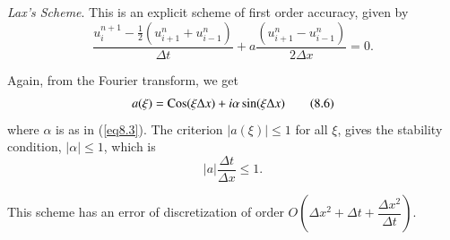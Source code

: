 \begin{exam}\label{chap8:exam8.2}
{\em Lax's Scheme}. This is an explicit scheme of first order accuracy, given by 
\begin{equation*}
\frac{u^{n+1}_i - \frac{1}{2} (u^n_{i+1} + u^n_{i-1})}{\Delta t} + a \frac{(u^n_{i+1} - u^n_{i-1})}{2 \Delta x} = 0. \tag{8.5}\label{eq8.5}
\end{equation*}

Again, from the Fourier transform, we get 
\begin{equation*}
a(\xi) = \operatorname{Cos} (\xi \Delta x) + i \alpha \sin (\xi \Delta x) \tag{8.6}\label{eq8.6}
\end{equation*}
where $\alpha$ is as in (\ref{eq8.3}). The criterion $|a(\xi)| \leq 1$ for all $\xi$, gives the stability condition, $|\alpha| \leq 1$, which is 
\begin{equation*}
|a| \frac{\Delta t}{\Delta x} \leq 1.\tag{8.7}\label{eq8.7}
\end{equation*}

This scheme has an error of discretization of order $O(\Delta x^2 + \Delta t + \dfrac{\Delta x^2}{\Delta t})$.
\end{exam}

